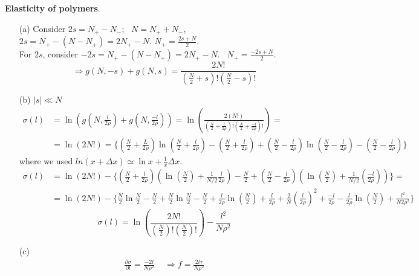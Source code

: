 \documentclass[twoside]{amsart}
\theoremstyle{plain}
\theoremstyle{definition}
\newcommand{\solutionhead}[1]
  {
   \noindent{\small\bf Solution #1.}
   }
\begin{document}
\solutionhead{10} \textbf{Elasticity of polymers}. \begin{itemize}
\item[(a)] Consider $2s = N_+ - N_-$; \, $N = N_+ + N_-$, \, $2s = N_+ - (N-N_+) = 2N_+ - N$.  \quad $N_+  = \frac{2s + N}{2}$.  \\
For $2s$, consider $-2s = N_+ - (N-N_+) = 2N_+ - N$.  \quad \, $N_+ = \frac{-2s + N}{2}$.  
\[
\Longrightarrow \boxed{ g(N,-s) + g(N,s) = \frac{2N!}{ \left( \frac{N}{2} + s \right)! \left( \frac{N}{2} - s \right)!} }
\]
\item[(b)] $|s| \ll N$
\[
\begin{aligned}
\sigma(l)  & =\ln{ \left( g\left( N, \frac{l}{2\rho } \right) + g\left( N, \frac{-l}{2\rho} \right) \right) }= \ln{ \left( \frac{ 2 (N!) }{ \left( \frac{N}{2} + \frac{l}{2\rho } \right)! \left( \frac{N}{2} + \frac{-l}{2\rho}\right)! } \right) } = \\
& = \ln{ (2N!) } = \lbrace \left( \frac{N}{2} + \frac{L}{2\rho } \right) \ln{ \left( \frac{N}{2} + \frac{l}{2\rho} \right) } - \left( \frac{N}{2} + \frac{l}{2\rho } \right) + \left( \frac{N}{2} - \frac{l}{2\rho} \right) \ln{ \left( \frac{N}{2} - \frac{l}{2\rho } \right) }  - \left( \frac{N}{2} - \frac{l}{2\rho} \right) \rbrace
\end{aligned}
\]
where we used $ln{ ( x + \Delta x )} \simeq \ln{x} + \frac{1}{x} \Delta x$.  
\[
 \begin{aligned} 
\sigma(l) & = \ln{( 2N!)} - \lbrace \left( \frac{N}{2} + \frac{l}{2\rho} \right) \left( \ln{\left( \frac{N}{2} \right) } + \frac{1}{N/2} \frac{l}{2\rho } \right) - \frac{N}{2} + \left( \frac{N}{2} - \frac{l}{2\rho} \right) \left( \ln{\left( \frac{N}{2} \right) } + \frac{1}{N/2} \left( \frac{ - l }{2\rho }\right) \right) \rbrace = \\
& = \ln{(2N!)} - \lbrace \frac{N}{2} \ln{\frac{N}{2}} - \frac{N}{2} + \frac{N}{2} \ln{\frac{N}{2}} - \frac{N}{2} + \frac{l}{2\rho} \ln{\left( \frac{N}{2} \right) } + \frac{l}{2\rho} + \frac{2}{N} \left( \frac{l}{2\rho} \right)^2 + \frac{ - l }{2\rho} - \frac{l}{2\rho } \ln{\left( \frac{N}{2} \right) } + \frac{l^2 }{ N 2\rho^2 } \rbrace 
\end{aligned}
\]
\[
\boxed{ \sigma(l)  = \ln{ \left( \frac{2N!}{ \left( \frac{N}{2} \right)! \left( \frac{N}{2} \right)!} \right) } - \frac{l^2 }{N \rho^2 } }
\]
\item[(c)] \[
\begin{gathered}
  \frac{\partial \sigma}{\partial l} = \frac{-2l}{N\rho^2} \quad \, \Longrightarrow \boxed{ f = \frac{2l\tau}{N \rho^2} }
\end{gathered}
\]
\end{itemize}
\end{document}

